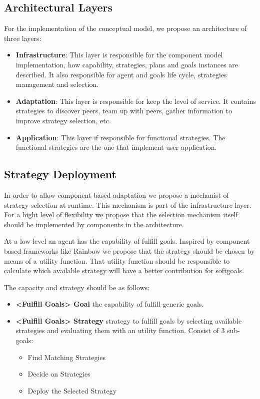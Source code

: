 \subsection{Architectural Layers}

For the implementation of the conceptual model, we propose an architecture of three layers:

\begin{itemize}
  \item \textbf{Infrastructure}: This layer is responsible for the component model implementation, how capability, strategies, plans and goals instances are described. It also responsible for agent and goals life cycle, strategies management and selection.
  \item \textbf{Adaptation}: This layer is responsible for keep the level of service. It contains strategies to discover peers, team up with peers, gather information to improve strategy selection, etc.
  \item \textbf{Application}: This layer if responsible for functional strategies. The functional strategies are the one that implement user application.
\end{itemize}

\subsection{Strategy Deployment}

In order to allow component based adaptation we propose a mechanist of strategy selection at runtime. This mechanism is part of the infrastructure layer. For a hight level of flexibility we propose that the selection mechanism itself should be implemented by components in the architecture.

At a low level an agent has the capability of fulfill goals. Inspired by component based frameworks like Rainbow\cite{garlan_rainbow:_2004} we propose that the strategy should be chosen by means of a utility function. That utility function should be responsible to calculate which available strategy will have a better contribution for softgoals.

The capacity and strategy should be as follows:

\begin{itemize}
\item \textbf{<Fulfill Goals> Goal} the capability of fulfill generic goals.

\item \textbf{<Fulfill Goals> Strategy } strategy to fulfill goals by selecting available strategies and evaluating them with an utility function. Consist of 3 sub-goals:
  \begin{itemize}
    \item Find Matching Strategies
    \item Decide on Strategies
    \item Deploy the Selected Strategy
  \end{itemize}
\end{itemize}

